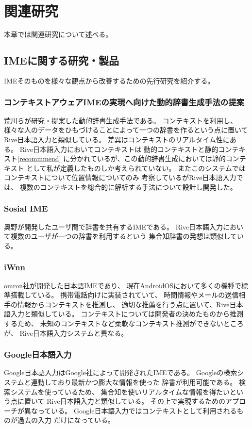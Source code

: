 \chapter{関連研究}
\label{chap:related}
本章では関連研究について述べる。

\newpage
\section{IMEに関する研究・製品}
IMEそのものを様々な観点から改善するための先行研究を紹介する。

\subsection{コンテキストアウェアIMEの実現へ向けた動的辞書生成手法の提案\cite{dynamicdictionarygeneration}}
荒川らが研究・提案した動的辞書生成手法である。
コンテキストを利用し、
様々な人のデータをひもづけることによって一つの辞書を作るという点に置いて
Rive日本語入力と類似している。
差異はコンテキストのリアルタイム性にある。
Rive日本語入力においてコンテキストは
動的コンテキストと静的コンテキスト\ref{recommmend}
に分かれているが、この動的辞書生成においては静的コンテキスト
として私が定義したものしか考えられていない。
またこのシステムではコンテキストについて位置情報についてのみ
考察しているがRive日本語入力では、
複数のコンテキストを総合的に解析する手法について設計し開発した。

\subsection{Sosial IME\cite{socialime}}
奥野が開発したユーザ間で辞書を共有するIMEである。
Rive日本語入力において複数のユーザが一つの辞書を利用するという
集合知辞書の発想は類似している。

\subsection{iWnn\cite{iwnn}}
omron社が開発した日本語IMEであり、
現在AndroidOS\cite{android}において多くの機種で標準搭載している。
携帯電話向けに実装されていて、
時間情報やメールの送信相手の情報からコンテキストを推測し、
適切な推薦を行う点に置いて、Rive日本語入力と類似している。
コンテキストについては開発者の決めたものから推測するため、
未知のコンテキストなど柔軟なコンテキスト推測ができないところが、
Rive日本語入力システムと異なる。

\subsection{Google日本語入力}
Google日本語入力はGoogle社によって開発されたIMEである。
Googleの検索システムと連動しており最新かつ膨大な情報を使った
辞書が利用可能である。
検索システムを使っているため、
集合知を使いリアルタイムな情報を得たいという点に置いて
Rive日本語入力と類似している。
その上で実現するためのアプローチが異なっている。
Google日本語入力ではコンテキストとして利用されるものが過去の入力
だけになっている。

